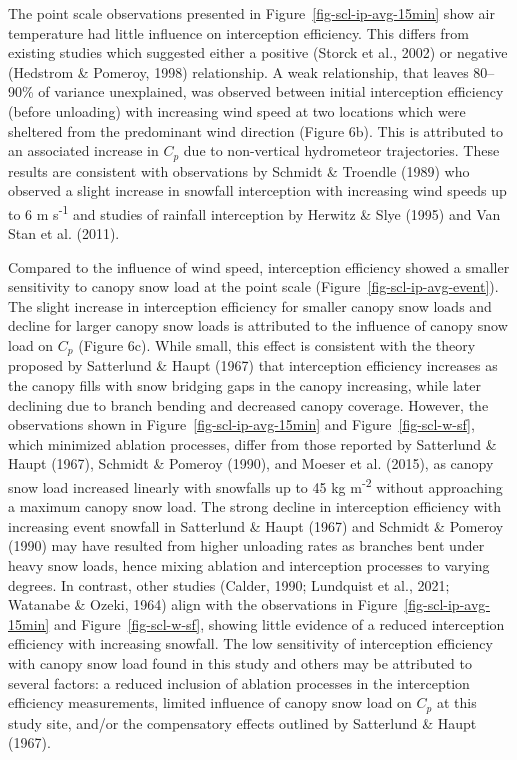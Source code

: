 \documentclass[
  letterpaper,
  DIV=11,
  numbers=noendperiod]{scrartcl}
\begin{document}
The point scale observations presented in
Figure~\ref{fig-scl-ip-avg-15min} show air temperature had little
influence on interception efficiency. This differs from existing studies
which suggested either a positive (Storck et al., 2002) or negative
(Hedstrom \& Pomeroy, 1998) relationship. A weak relationship, that
leaves 80--90\% of variance unexplained, was observed between initial
interception efficiency (before unloading) with increasing wind speed at
two locations which were sheltered from the predominant wind direction
(Figure 6b). This is attributed to an associated increase in \(C_p\) due
to non-vertical hydrometeor trajectories. These results are consistent
with observations by Schmidt \& Troendle (1989) who observed a slight
increase in snowfall interception with increasing wind speeds up to 6 m
s\textsuperscript{-1} and studies of rainfall interception by Herwitz \&
Slye (1995) and Van Stan et al. (2011).

Compared to the influence of wind speed, interception efficiency showed
a smaller sensitivity to canopy snow load at the point scale
(Figure~\ref{fig-scl-ip-avg-event}). The slight increase in interception
efficiency for smaller canopy snow loads and decline for larger canopy
snow loads is attributed to the influence of canopy snow load on \(C_p\)
(Figure 6c). While small, this effect is consistent with the theory
proposed by Satterlund \& Haupt (1967) that interception efficiency
increases as the canopy fills with snow bridging gaps in the canopy
increasing, while later declining due to branch bending and decreased
canopy coverage. However, the observations shown in
Figure~\ref{fig-scl-ip-avg-15min} and Figure~\ref{fig-scl-w-sf}, which
minimized ablation processes, differ from those reported by Satterlund
\& Haupt (1967), Schmidt \& Pomeroy (1990), and Moeser et al. (2015), as
canopy snow load increased linearly with snowfalls up to 45 kg
m\textsuperscript{-2} without approaching a maximum canopy snow load.
The strong decline in interception efficiency with increasing event
snowfall in Satterlund \& Haupt (1967) and Schmidt \& Pomeroy (1990) may
have resulted from higher unloading rates as branches bent under heavy
snow loads, hence mixing ablation and interception processes to varying
degrees. In contrast, other studies (Calder, 1990; Lundquist et al.,
2021; Watanabe \& Ozeki, 1964) align with the observations in
Figure~\ref{fig-scl-ip-avg-15min} and Figure~\ref{fig-scl-w-sf}, showing
little evidence of a reduced interception efficiency with increasing
snowfall. The low sensitivity of interception efficiency with canopy
snow load found in this study and others may be attributed to several
factors: a reduced inclusion of ablation processes in the interception
efficiency measurements, limited influence of canopy snow load on
\(C_p\) at this study site, and/or the compensatory effects outlined by
Satterlund \& Haupt (1967).
\end{document}
